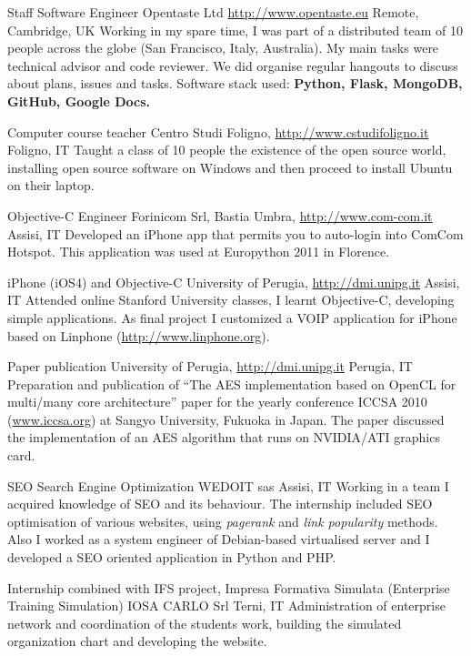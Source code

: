 \documentclass[10pt,a4paper,sans]{moderncv}
\begin{document}
    {Staff Software Engineer}
    {Opentaste Ltd \url{http://www.opentaste.eu}}
    {Remote, Cambridge, UK}{}
    {Working in my spare time, I was part of a distributed team of 10 people
    across the globe (San Francisco, Italy, Australia). My main tasks were
    technical advisor and code reviewer. We did organise regular hangouts
    to discuss about plans, issues and tasks.
    Software stack used: \textbf{Python, Flask, MongoDB, GitHub, Google Docs.}}

    {Computer course teacher}
    {Centro Studi Foligno, \url{http://www.cstudifoligno.it}}
    {Foligno, IT}{}
    {Taught a class of 10 people the existence of the open source world,
    installing open source software on Windows and then proceed to install
    Ubuntu on their laptop.}

    {Objective-C Engineer}
    {Forinicom Srl, Bastia Umbra, \url{http://www.com-com.it}}
    {Assisi, IT}{}
    {Developed an iPhone app that permits you to auto-login into ComCom
    Hotspot. This application was used at Europython 2011 in Florence.}

    {iPhone (iOS4) and Objective-C}
    {University of Perugia, \url{http://dmi.unipg.it}}
    {Assisi, IT}{}
    {Attended online Stanford University classes, I learnt Objective-C,
    developing simple applications. As final project I customized a VOIP
    application for iPhone based on Linphone (\url{http://www.linphone.org}).}

    {Paper publication\cite{aes}}
    {University of Perugia, \url{http://dmi.unipg.it}}
    {Perugia, IT}{}
    {Preparation and publication of ``The AES implementation based on OpenCL
    for multi/many core architecture'' paper for the yearly conference ICCSA
    2010 (\url{www.iccsa.org}) at Sangyo University, Fukuoka in Japan. The
    paper discussed the implementation of an AES algorithm that runs on
    NVIDIA/ATI graphics card.}

    {SEO Search Engine Optimization}
    {WEDOIT sas}
    {Assisi, IT}{}
    {Working in a team I acquired knowledge of SEO and its behaviour. The
    internship included SEO optimisation of various websites, using
    \emph{pagerank} and \emph{link popularity} methods. Also I worked as a
    system engineer of Debian-based virtualised server and I developed a SEO
    oriented application in Python and PHP.}

    {Internship combined with IFS project, Impresa Formativa Simulata
        (Enterprise Training Simulation)}
    {IOSA CARLO Srl}
    {Terni, IT}{}
    {Administration of enterprise network and coordination of the students
    work, building the simulated organization chart and developing the
    website.}
\end{document}
